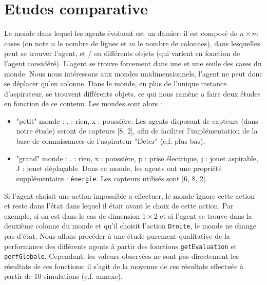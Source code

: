 \documentclass[12pt]{article}
\begin{document}
\section{Etudes comparative}
Le monde dans lequel les agents évoluent est un damier: il est composé de $n \times m$ cases (on note $n$ le nombre de lignes et $m$ le nombre de colonnes), dans lesquelles peut se trouver l'agent, et / ou différents objets (qui varient en fonction de l'agent considéré). L'agent se trouve forcement dans une et une seule des cases du monde.
Nous nous intéressons aux mondes unidimensionnels, l'agent ne peut donc se déplacer qu'en colonne. Dans le monde, en plus de l'unique instance d'aspirateur, se trouvent différents objets, ce qui nous ramène a faire deux études en fonction de ce contenu. Les mondes sont alors : 
\begin{itemize}
\item "petit" monde : . : rien, x : poussière. Les agents disposant de capteurs (dans notre étude) seront de capteurs [8, 2], afin de faciliter l'implémentation de la base de connaissances de l'aspirateur "Deter" (c.f. plus bas). 
\item "grand" monde : . : rien, x : poussière, p : prise électrique, j : jouet aspirable, J : jouet déplaçable. Dans ce monde, les agents ont une propriété supplémentaire : \texttt{énergie}. Les capteurs utilisés sont [6, 8, 2].
\end{itemize}
Si l'agent choisit une action impossible a effectuer, le monde ignore cette action et reste dans l'état dans lequel il était avant le choix de cette action. Par exemple, si on est dans le cas de dimension $1 \times 2$ et si l'agent se trouve dans la deuxième colonne du monde et qu'il choisit l'action \texttt{Droite}, le monde ne change pas d'état. 
\justify
Nous allons procéder à une étude purement qualitative de la performance des différents agents à partir des fonctions \texttt{getEvaluation} et \texttt{perfGlobale}. Cependant, les valeurs observées ne sont pas directement les résultats de ces fonctions: il s'agit de la moyenne de ces résultats effectuée à partir de 10 simulations (c.f. annexe). 
\end{document}
